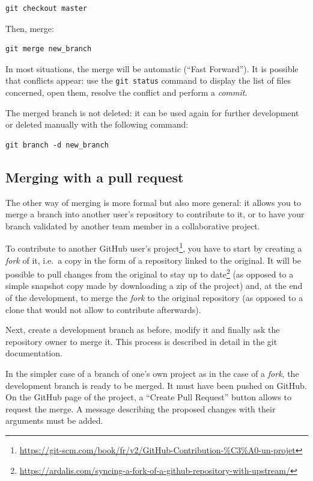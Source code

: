 \documentclass[
  12pt,
  american,
  a4paper,
  extrafontsizes,onecolumn,openright
  ]{memoir}
\newlength{\rf}
\begin{document}
\begin{verbatim}
git checkout master
\end{verbatim}

Then, merge:

\begin{verbatim}
git merge new_branch
\end{verbatim}

In most situations, the merge will be automatic (\enquote{Fast Forward}).
It is possible that conflicts appear: use the \texttt{git\ status} command to display the list of files concerned, open them, resolve the conflict and perform a \emph{commit}.

The merged branch is not deleted: it can be used again for further development or deleted manually with the following command:

\begin{verbatim}
git branch -d new_branch
\end{verbatim}

\subsection{Merging with a pull request}\label{merging-with-a-pull-request}

The other way of merging is more formal but also more general: it allows you to merge a branch into another user's repository to contribute to it, or to have your branch validated by another team member in a collaborative project.

To contribute to another GitHub user's project\footnote{\url{https://git-scm.com/book/fr/v2/GitHub-Contribution-\%C3\%A0-un-projet}}, you have to start by creating a \emph{fork} of it, i.e.~a copy in the form of a repository linked to the original.
It will be possible to pull changes from the original to stay up to date\footnote{\url{https://ardalis.com/syncing-a-fork-of-a-github-repository-with-upstream/}} (as opposed to a simple snapshot copy made by downloading a zip of the project) and, at the end of the development, to merge the \emph{fork} to the original repository (as opposed to a clone that would not allow to contribute afterwards).

Next, create a development branch as before, modify it and finally ask the repository owner to merge it.
This process is described in detail in the git documentation.

In the simpler case of a branch of one's own project as in the case of a \emph{fork}, the development branch is ready to be merged.
It must have been pushed on GitHub.
On the GitHub page of the project, a \enquote{Create Pull Request} button allows to request the merge.
A message describing the proposed changes with their arguments must be added.
\end{document}
